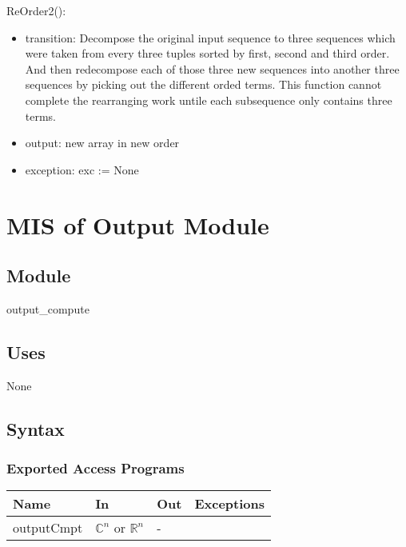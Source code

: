 \documentclass[12pt, titlepage]{article}
\begin{document}
ReOrder2():
\begin{itemize}
\item transition:  Decompose the original input sequence to three sequences which were taken from every three tuples sorted by first, second and third order.
And then redecompose each of those three new sequences into another three sequences by picking out the different orded terms.
This function cannot complete the rearranging work untile each subsequence only contains three terms.\\
\item output:  new array in new order
\item exception: exc := None

\end{itemize}


\section{MIS of Output  Module} \label{Input} 

\subsection{Module}

output\_compute

\subsection{Uses}
None
\subsection{Syntax}

\subsubsection{Exported Access Programs}

\begin{center}
\begin{tabular}{p{2cm} p{4cm} p{4cm} p{2cm}}
\hline
\textbf{Name} & \textbf{In} & \textbf{Out} & \textbf{Exceptions} \\
\hline
outputCmpt & $\mathbb{C}^ n$ or $\mathbb{R}^ n$& - & \\

\hline
\end{tabular}
\end{center}
\end{document}
